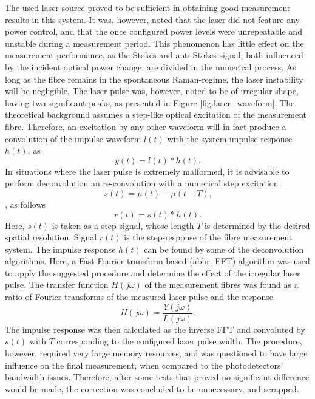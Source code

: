 \documentclass{standalone}
\begin{document}
The used laser source proved to be sufficient in obtaining good measurement results in this system. It was, however, noted that the laser did not feature any power control, and that the once configured power levels were unrepeatable and unstable during a measurement period. This phenomenon has little effect on the measurement performance, as the Stokes and anti-Stokes signal, both influenced by the incident optical power change, are divided in the numerical process. As long as the fibre remains in the spontaneous Raman-regime, the laser instability will be negligible. The laser pulse was, however, noted to be of irregular shape, having two significant peaks, as presented in Figure \ref{fig:laser_waveform}.
The theoretical background assumes a step-like optical excitation of the measurement fibre. Therefore, an excitation by any other waveform will in fact produce a convolution of the impulse waveform $l(t)$ with the system impulse response $h(t)$, as
\begin{equation}
y(t) = l(t) \ast h(t) \textrm{.}
\end{equation}
In situations where the laser pulse is extremely malformed, it is advisable to perform deconvolution an re-convolution with a numerical step excitation
\begin{equation}
s(t) = \mu(t) - \mu(t-T) \textrm{,}
\end{equation}, as follows
\begin{equation}
r(t) = s(t) \ast h(t) \textrm{.}
\end{equation}
Here, $s(t)$ is taken as a step signal, whose length $T$ is determined by the desired spatial resolution. Signal $r(t)$ is the step-response of the fibre measurement system. The impulse response $h(t)$ can be found by some of the deconvolution algorithms. Here, a Fast-Fourier-transform-based (abbr. FFT) algorithm was used to apply the suggested procedure and determine the effect of the irregular laser pulse. The transfer function $H(j\omega)$ of the measurement fibres was found as a ratio of Fourier transforms of the measured laser pulse and the response
\begin{equation}
H(j\omega) = \frac{Y(j\omega)}{L(j\omega)} \textrm{.}
\end{equation}
The impulse response was then calculated as the inverse FFT and convoluted by $s(t)$ with $T$ corresponding to the configured laser pulse width. The procedure, however, required very large memory resources, and was questioned to have large influence on the final measurement, when compared to the photodetectors' bandwidth issues. Therefore, after some tests that proved no significant difference would be made, the correction was concluded to be unnecessary, and scrapped. \\




\setcounter{stranica}{\thepage}
\addtocounter{stranica}{1}
\end{document}
